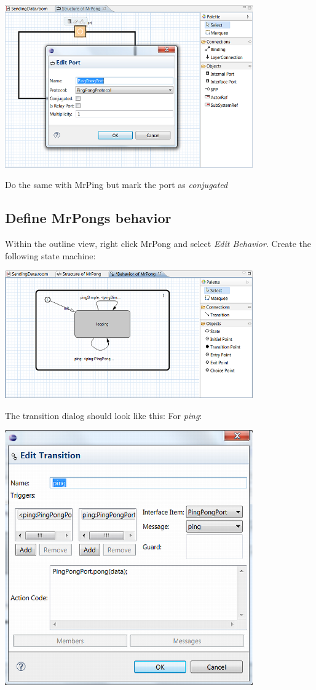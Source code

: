 \includegraphics[width=0.8\textwidth]{images/025-SendingData02.png}

Do the same with MrPing but mark the port as \textit{conjugated}

\subsection{Define MrPongs behavior}

Within the outline view, right click MrPong and select \textit{Edit Behavior}. Create the following state 
machine:

\includegraphics[width=0.8\textwidth]{images/025-SendingData04.png}

The transition dialog should look like this:
For \textit{ping}:

\includegraphics[width=0.8\textwidth]{images/025-SendingData05.png}

